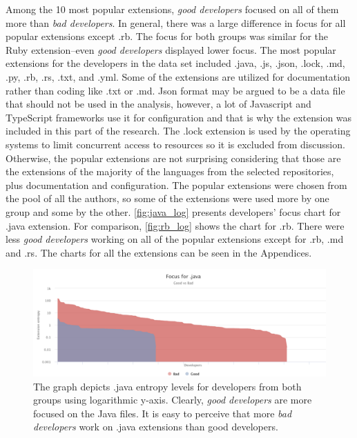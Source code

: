 Among the 10 most popular extensions, \textit{good developers} focused on all of them more than \textit{bad developers}. In general, there was a large difference in focus for all popular extensions except .rb. The focus for both groups was similar for the Ruby extension–even \textit{good developers} displayed lower focus. The most popular extensions for the developers in the data set included .java, .js, .json, .lock, .md, .py, .rb, .rs, .txt, and .yml. Some of the extensions are utilized for documentation rather than coding like .txt or .md. Json format may be argued to be a data file that should not be used in the analysis, however, a lot of Javascript and TypeScript frameworks use it for configuration and that is why the extension was included in this part of the research. The .lock extension is used by the operating systems to limit concurrent access to resources so it is excluded from discussion. Otherwise, the popular extensions are not surprising considering that those are the extensions of the majority of the languages from the selected repositories, plus documentation and configuration. The popular extensions were chosen from the pool of all the authors, so some of the extensions were used more by one group and some by the other. \autoref{fig:java_log} presents developers' focus chart for .java extension. For comparison, \autoref{fig:rb_log} shows the chart for .rb. There were less \textit{good developers} working on all of the popular extensions except for .rb, .md and .rs. The charts for all the extensions can be seen in the Appendices. \par

\begin{figure}[htpb]
  \centering
  \includegraphics[width=1\textwidth]{figures/java_log}
  \caption[Focus for .java]{The graph depicts .java entropy levels for developers from both groups using logarithmic y-axis. Clearly, \textit{good developers} are more focused on the Java files.  It is easy to perceive that more \textit{bad developers} work on .java extensions than good developers.} \label{fig:java_log}
\end{figure}

